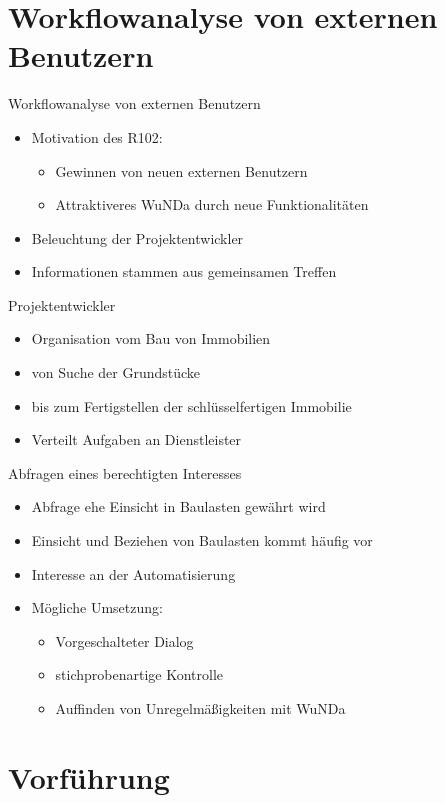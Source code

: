 \documentclass{beamer}
\begin{document}
\section{Workflowanalyse von externen Benutzern}

\begin{frame}{Workflowanalyse von externen Benutzern}
  \begin{itemize}
  \item
    Motivation des R102:
    \begin{itemize}
    \item Gewinnen von neuen externen Benutzern
    \item Attraktiveres WuNDa durch neue Funktionalitäten 
    \end{itemize}
    \pause
  \item
    Beleuchtung der Projektentwickler \pause
      \item
    Informationen stammen aus gemeinsamen Treffen
  \end{itemize}
\end{frame}

\begin{frame}{Projektentwickler}
  \begin{itemize}
  \item
    Organisation vom Bau von Immobilien
    \pause
  \item
    von Suche der Grundstücke \pause
  \item bis zum Fertigstellen der schlüsselfertigen Immobilie  \pause
  \item Verteilt Aufgaben an Dienstleister
  \end{itemize}
\end{frame}

\begin{frame}{Abfragen eines berechtigten Interesses}
  \begin{itemize}
  \item
    Abfrage ehe Einsicht in Baulasten gewährt wird
    \pause
  \item
    Einsicht und Beziehen von Baulasten kommt häufig vor \pause
  \item Interesse an der Automatisierung \pause
  \item Mögliche Umsetzung:
  \begin{itemize}
  \item Vorgeschalteter Dialog \pause
  \item stichprobenartige Kontrolle
  \item Auffinden von Unregelmäßigkeiten mit WuNDa
  \end{itemize}
  \end{itemize}
\end{frame}

\section{Vorführung}
\end{document}

